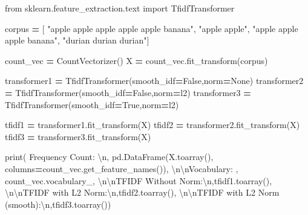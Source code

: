 \documentclass[
]{book}
\newenvironment{Shaded}{\begin{snugshade}}{\end{snugshade}}
\newcommand{\BuiltInTok}[1]{#1}
\newcommand{\CharTok}[1]{\textcolor[rgb]{0.5,0.5,0.5}{#1}}
\newcommand{\ImportTok}[1]{#1}
\newcommand{\NormalTok}[1]{#1}
\newcommand{\OperatorTok}[1]{\textcolor[rgb]{0.43,0.43,0.43}{\textbf{#1}}}
\newcommand{\StringTok}[1]{\textcolor[rgb]{0.5,0.5,0.5}{#1}}
\newcommand{\VariableTok}[1]{\textcolor[rgb]{0,0,0}{#1}}
\begin{document}
\begin{Shaded}
\begin{Highlighting}[]
\ImportTok{from}\NormalTok{ sklearn.feature\_extraction.text }\ImportTok{import}\NormalTok{ TfidfTransformer}

\NormalTok{corpus }\OperatorTok{=}\NormalTok{ [}
    \StringTok{"apple apple apple apple apple banana"}\NormalTok{,}
    \StringTok{"apple apple"}\NormalTok{,}
    \StringTok{"apple apple apple banana"}\NormalTok{,}
    \StringTok{"durian durian durian"}\NormalTok{]}
    
\NormalTok{count\_vec }\OperatorTok{=}\NormalTok{ CountVectorizer()}
\NormalTok{X }\OperatorTok{=}\NormalTok{ count\_vec.fit\_transform(corpus)}

\NormalTok{transformer1 }\OperatorTok{=}\NormalTok{ TfidfTransformer(smooth\_idf}\OperatorTok{=}\VariableTok{False}\NormalTok{,norm}\OperatorTok{=}\VariableTok{None}\NormalTok{)}
\NormalTok{transformer2 }\OperatorTok{=}\NormalTok{ TfidfTransformer(smooth\_idf}\OperatorTok{=}\VariableTok{False}\NormalTok{,norm}\OperatorTok{=}\StringTok{\textquotesingle{}l2\textquotesingle{}}\NormalTok{)}
\NormalTok{transformer3 }\OperatorTok{=}\NormalTok{ TfidfTransformer(smooth\_idf}\OperatorTok{=}\VariableTok{True}\NormalTok{,norm}\OperatorTok{=}\StringTok{\textquotesingle{}l2\textquotesingle{}}\NormalTok{)}

\NormalTok{tfidf1 }\OperatorTok{=}\NormalTok{ transformer1.fit\_transform(X)}
\NormalTok{tfidf2 }\OperatorTok{=}\NormalTok{ transformer2.fit\_transform(X)}
\NormalTok{tfidf3 }\OperatorTok{=}\NormalTok{ transformer3.fit\_transform(X)}

\BuiltInTok{print}\NormalTok{(}
  \StringTok{\textquotesingle{}Frequency Count: }\CharTok{\textbackslash{}n}\StringTok{\textquotesingle{}}\NormalTok{, pd.DataFrame(X.toarray(), columns}\OperatorTok{=}\NormalTok{count\_vec.get\_feature\_names()),}
  \StringTok{\textquotesingle{}}\CharTok{\textbackslash{}n\textbackslash{}n}\StringTok{Vocabulary: \textquotesingle{}}\NormalTok{, count\_vec.vocabulary\_,}
  \StringTok{\textquotesingle{}}\CharTok{\textbackslash{}n\textbackslash{}n}\StringTok{TFIDF Without Norm:}\CharTok{\textbackslash{}n}\StringTok{\textquotesingle{}}\NormalTok{,tfidf1.toarray(), }
  \StringTok{\textquotesingle{}}\CharTok{\textbackslash{}n\textbackslash{}n}\StringTok{TFIDF with L2 Norm:}\CharTok{\textbackslash{}n}\StringTok{\textquotesingle{}}\NormalTok{,tfidf2.toarray(),  }
  \StringTok{\textquotesingle{}}\CharTok{\textbackslash{}n\textbackslash{}n}\StringTok{TFIDF with L2 Norm (smooth):}\CharTok{\textbackslash{}n}\StringTok{\textquotesingle{}}\NormalTok{,tfidf3.toarray())}
\end{Highlighting}
\end{Shaded}
\end{document}
